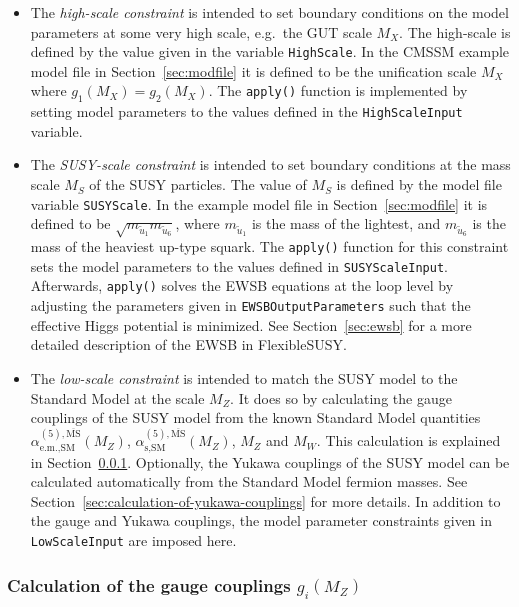 \documentclass[final,3p,11pt,pdflatex]{elsarticle}
\makeatletter
\newcommand{\fs}{FlexibleSUSY\@\xspace}
\newcommand{\code}[1]{\lstinline|#1|}  %
\newcommand{\textoverline}[1]{$\overline{\mbox{#1}}$}
\newcommand{\MSbar}{\textoverline{MS}\xspace}
\newcommand{\secref}[1]{Section~\ref{#1}}
\makeatother
\begin{document}
\begin{itemize}
\item The \emph{high-scale constraint} is intended to set boundary
  conditions on the model parameters at some very high scale, e.g.\
  the GUT scale $M_X$.  The high-scale is defined by the value given
  in the variable \code{HighScale}.  In the CMSSM example model file
  in \secref{sec:modfile} it is defined to be the unification scale
  $M_X$ where $g_1(M_X) = g_2(M_X)$.  The \code{apply()} function is
  implemented by setting model parameters to the values defined in the
  \code{HighScaleInput} variable.

\item The \emph{SUSY-scale constraint} is intended to set boundary
  conditions at the mass scale $M_S$ of the SUSY particles.  The value
  of $M_S$ is defined by the model file variable \code{SUSYScale}.  In
  the example model file in \secref{sec:modfile} it is defined to be
  $\sqrt{m_{\tilde{u}_1} m_{\tilde{u}_6}}$, where $m_{\tilde{u}_1}$ is
  the mass of the lightest, and $m_{\tilde{u}_6}$ is the mass of the
  heaviest up-type squark.  The \code{apply()} function for this
  constraint sets the model parameters to the values defined in
  \code{SUSYScaleInput}.  Afterwards, \code{apply()} solves the EWSB
  equations at the loop level by adjusting the parameters given in
  \code{EWSBOutputParameters} such that the effective Higgs potential
  is minimized.  See \secref{sec:ewsb} for a more detailed description
  of the EWSB in \fs.

\item The \emph{low-scale constraint} is intended to match the SUSY
  model to the Standard Model at the scale $M_Z$.  It does so by
  calculating the gauge couplings of the SUSY model from the known
  Standard Model quantities
  $\alpha_{\text{e.m.},\text{SM}}^{(5),\text{\MSbar}}(M_Z)$,
  $\alpha_{\text{s},\text{SM}}^{(5),\text{\MSbar}}(M_Z)$, $M_Z$ and
  $M_W$.  This calculation is explained in
  \secref{sec:calculation-of-gauge-couplings}.  Optionally, the Yukawa
  couplings of the SUSY model can be calculated automatically from the
  Standard Model fermion masses.  See
  \secref{sec:calculation-of-yukawa-couplings} for more details.  In
  addition to the gauge and Yukawa couplings, the model parameter
  constraints given in \code{LowScaleInput} are imposed here.
\end{itemize}

\subsubsection{Calculation of the gauge couplings $g_i(M_Z)$}
\label{sec:calculation-of-gauge-couplings}
\end{document}
